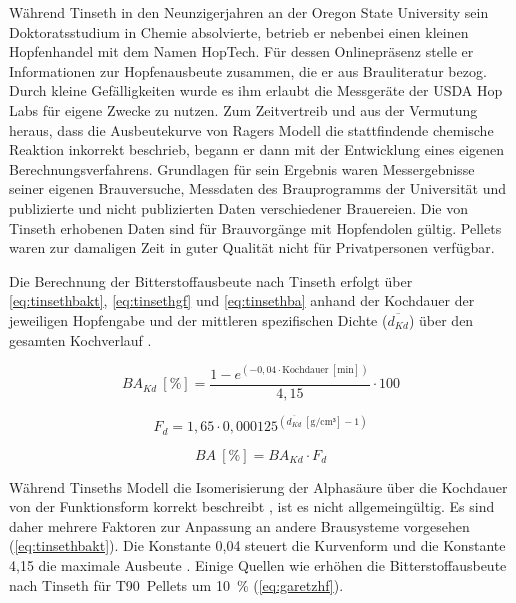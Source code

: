 \documentclass[a4paper,parskip=half]{scrartcl}
\newcommand{\BA}{\mathit{BA}}
\newcommand{\BAKt}{{\mathit{BA}}_{\mathit{Kd}}}
\newcommand{\umin}{\:[\textrm{min}]}
\newcommand{\uden}{\:[\text{g/cm³}]}
\newcommand{\uper}{\:[\text{\%}]}
\newcommand{\FKd}{F_{\mathit{d}}}
\newcommand{\dKt}{\overline{d_{\mathit{Kd}}}}
\begin{document}
Während Tinseth in den Neunzigerjahren an der Oregon State University sein Doktoratsstudium in Chemie absolvierte, betrieb er nebenbei einen kleinen Hopfenhandel mit dem Namen HopTech. Für dessen Onlinepräsenz stelle er Informationen zur Hopfenausbeute zusammen, die er aus Brauliteratur bezog. Durch kleine Gefälligkeiten wurde es ihm erlaubt die Messgeräte der USDA Hop Labs für eigene Zwecke zu nutzen. Zum Zeitvertreib und aus der Vermutung heraus, dass die Ausbeutekurve von Ragers Modell die stattfindende chemische Reaktion inkorrekt beschrieb, begann er dann mit der Entwicklung eines eigenen Berechnungsverfahrens. Grundlagen für sein Ergebnis waren Messergebnisse seiner eigenen Brauversuche, Messdaten des Brauprogramms der Universität und publizierte und nicht publizierten Daten verschiedener Brauereien. Die von Tinseth erhobenen Daten sind für Brauvorgänge mit Hopfendolen gültig. Pellets waren zur damaligen Zeit in guter Qualität nicht für Privatpersonen verfügbar. \parencites[0:55:45-1:08:00]{Beechum2017a}[2:10-6:30]{Smith2011}

Die Berechnung der Bitterstoffausbeute nach Tinseth erfolgt über \autoref{eq:tinsethbakt}, \autoref{eq:tinsethgf} und \autoref{eq:tinsethba} anhand der Kochdauer der jeweiligen Hopfengabe und der mittleren spezifischen Dichte ($\dKt$) über den gesamten Kochverlauf \parencite{Tinseth1997}.

\begin{equation}
\BAKt \uper = \frac{1 - e^{\left(-0,04 \cdot \text{Kochdauer} \umin \right)}}{4,15} \cdot 100
\label{eq:tinsethbakt}
\end{equation}

\begin{equation}
\FKd = 1,65 \cdot 0,000125^{\left(\overline{d_{\mathit{Kd}}} \uden - 1 \right)}
\label{eq:tinsethgf}
\end{equation}

\begin{equation}
\BA \uper = \BAKt \cdot \FKd
\label{eq:tinsethba}
\end{equation}

Während Tinseths Modell die Isomerisierung der Alphasäure über die Kochdauer von der Funktionsform korrekt beschreibt \parencite[43]{Malowicki2005}, ist es nicht allgemeingültig. Es sind daher mehrere Faktoren zur Anpassung an andere Brausysteme vorgesehen (\autoref{eq:tinsethbakt}). Die Konstante 0,04 steuert die Kurvenform und die Konstante 4,15 die maximale Ausbeute \parencite{Tinseth1997}. Einige Quellen wie \textcite{Novotny2018} erhöhen die Bitterstoffausbeute nach Tinseth für T90~Pellets um 10~\% (\autoref{eq:garetzhf}).
\end{document}

